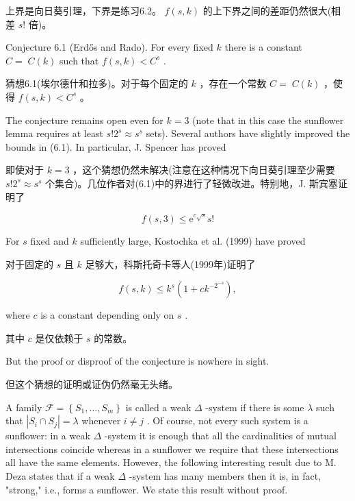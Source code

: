 \documentclass[10pt]{article}
\begin{document}
\begin{tcolorbox}\relax
上界是向日葵引理，下界是练习6.2。 \(f\left( {s,k}\right)\) 的上下界之间的差距仍然很大(相差 \(s!\) 倍)。
\end{tcolorbox}

Conjecture 6.1 (Erdős and Rado). For every fixed \(k\) there is a constant \(C = \; C\left( k\right)\) such that \(f\left( {s,k}\right)  < {C}^{s}\) .

\begin{tcolorbox}\relax
猜想6.1(埃尔德什和拉多)。对于每个固定的 \(k\) ，存在一个常数 \(C = \; C\left( k\right)\) ，使得 \(f\left( {s,k}\right)  < {C}^{s}\) 。
\end{tcolorbox}

The conjecture remains open even for \(k = 3\) (note that in this case the sunflower lemma requires at least \(s!{2}^{s} \approx  {s}^{s}\) sets). Several authors have slightly improved the bounds in (6.1). In particular, J. Spencer has proved

\begin{tcolorbox}\relax
即使对于 \(k = 3\) ，这个猜想仍然未解决(注意在这种情况下向日葵引理至少需要 \(s!{2}^{s} \approx  {s}^{s}\) 个集合)。几位作者对(6.1)中的界进行了轻微改进。特别地，J. 斯宾塞证明了
\end{tcolorbox}

\[
f\left( {s,3}\right)  \leq  {\mathrm{e}}^{c\sqrt{s}}s!
\]

For \(s\) fixed and \(k\) sufficiently large, Kostochka et al. (1999) have proved

\begin{tcolorbox}\relax
对于固定的 \(s\) 且 \(k\) 足够大，科斯托奇卡等人(1999年)证明了
\end{tcolorbox}

\[
f\left( {s,k}\right)  \leq  {k}^{s}\left( {1 + c{k}^{-{2}^{-s}}}\right) ,
\]

where \(c\) is a constant depending only on \(s\) .

\begin{tcolorbox}\relax
其中 \(c\) 是仅依赖于 \(s\) 的常数。
\end{tcolorbox}

But the proof or disproof of the conjecture is nowhere in sight.

\begin{tcolorbox}\relax
但这个猜想的证明或证伪仍然毫无头绪。
\end{tcolorbox}

A family \(\mathcal{F} = \left\{  {{S}_{1},\ldots ,{S}_{m}}\right\}\) is called a weak \(\Delta\) -system if there is some \(\lambda\) such that \(\left| {{S}_{i} \cap  {S}_{j}}\right|  = \lambda\) whenever \(i \neq  j\) . Of course, not every such system is a sunflower: in a weak \(\Delta\) -system it is enough that all the cardinalities of mutual intersections coincide whereas in a sunflower we require that these intersections all have the same elements. However, the following interesting result due to M. Deza states that if a weak \(\Delta\) -system has many members then it is, in fact, "strong," i.e., forms a sunflower. We state this result without proof.
\end{document}
